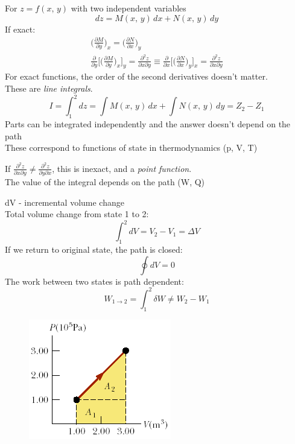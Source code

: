 \documentclass[a4paper, 11pt, normalem]{report}
\newcommand\p{\partial}
\begin{document}
For $z = f(x,\,y)$ with two independent variables
\begin{equation*}
    dz = M(x,\,y)\,dx + N(x,\,y)\,dy
\end{equation*}
If exact:
\begin{gather*}
    \Big(\frac{\p M}{\p y} \Big)_x = \Big(\frac{\p N}{\p x} \Big)_y \\
    \frac{\p}{\p y}\Bigg[\Big(\frac{\p M}{\p y} \Big)_x \Bigg]_y = \frac{\p^2 z}{\p x \p y} \equiv \frac{\p}{\p x}\Bigg[\Big(\frac{\p N}{\p x}\Big)_y \Bigg]_x = \frac{\p^2 z}{\p x \p y}
\end{gather*}
For exact functions, the order of the second derivatives doesn't matter. \\
These are \emph{line integrals}.
\begin{equation*}
    I = \int_{1}^{2} dz = \int M(x,\,y)\,dx + \int N(x,\,y)\,dy = Z_2 - Z_1
\end{equation*}
Parts can be integrated independently and the answer doesn't depend on the path \\
These correspond to functions of state in thermodynamics (p, V, T)

If $\frac{\p^2 z}{\p x \p y} \neq \frac{\p^2 z}{\p y \p x}$, this is inexact, and a \emph{point function}. \\
The value of the integral depends on the path (W, Q)

dV - incremental volume change \\
Total volume change from state 1 to 2:
\begin{equation*}
    \int_{1}^{2} dV = V_2 - V_1 = \Delta V
\end{equation*}
If we return to original state, the path is closed:
\begin{equation*}
    \oint dV = 0
\end{equation*}
The work between two states is path dependent:
\begin{equation*}
    W_{1 \to 2} = \int_{1}^{2} \delta W \neq W_2 - W_1
\end{equation*}
\begin{figure}
    \begin{center}
        \includegraphics[scale=0.6]{WorkPV.png}
    \end{center}
    \vspace{-120pt}
\end{figure}
\end{document}
